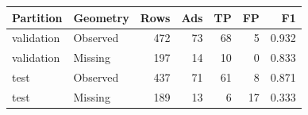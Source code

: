 \begin{tabular}{llrrrrr}\toprule
Partition & Geometry & Rows & Ads & TP & FP & F1\\\midrule
validation & Observed & 472 & 73 & 68 & 5 & 0.932\\
validation & Missing & 197 & 14 & 10 & 0 & 0.833\\
test & Observed & 437 & 71 & 61 & 8 & 0.871\\
test & Missing & 189 & 13 & 6 & 17 & 0.333\\
\bottomrule\end{tabular}
